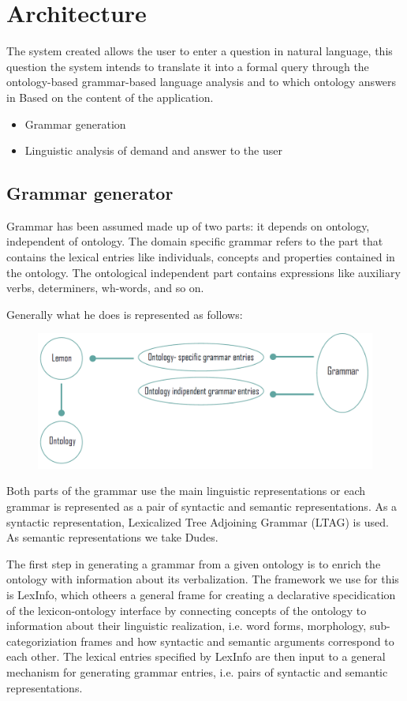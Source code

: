 \section{Architecture}
\label{sec:architecture}
The system created allows the user to enter a question in natural language, this question the system intends to translate it into a formal query through the ontology-based grammar-based language analysis and to which ontology answers in Based on the content of the application.
\begin{itemize}
	\item Grammar generation
	\item Linguistic analysis of demand and answer to the user
\end{itemize}

\subsection{Grammar generator}
Grammar has been assumed made up of two parts: it depends on ontology, independent of ontology. The domain specific grammar refers to the part that contains the lexical entries like individuals, concepts and properties contained in the ontology. The ontological independent part contains expressions like auxiliary verbs, determiners, wh-words, and so on.

Generally what he does is represented as follows:

\begin{figure}[tp]
   \centering
    \includegraphics[scale=100]{./fig/grammar}
    \label{fig: grammar}
\end{figure}

Both parts of the grammar use the main linguistic representations or each grammar is represented as a pair of syntactic and semantic representations. As a syntactic representation, Lexicalized Tree Adjoining Grammar (LTAG) is used. As semantic representations we take Dudes.

The first step in generating a grammar from a given ontology is to enrich the ontology with information about its verbalization. The framework we use for this is LexInfo, which otheers a general frame for creating a declarative specidication of the lexicon-ontology interface by connecting concepts of the ontology to information about their linguistic realization, i.e. word forms, morphology, sub-categoriziation frames and how syntactic and semantic arguments correspond to each other. The lexical entries specified by LexInfo are then input to a general mechanism for generating grammar entries, i.e. pairs of syntactic and semantic
representations.

